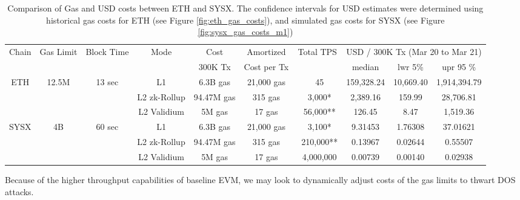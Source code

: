 \documentclass[peerreview]{ieeesyscoin}
\begin{document}
\begin{table}[h!]
\centering
\begin{tabular}{ |c|c|c|c|c|c|c|c|c|c|   } 
\hline
Chain & Gas  Limit & Block Time & Mode & Cost  & Amortized  & Total TPS & \multicolumn{3}{|c|}{USD / 300K Tx (Mar 20 to Mar 21) } \\
 &  &  &  &  300K Tx  & Cost per Tx  &  & median & lwr 5\% &  upr 95 \% \\ 
\hline
\multirow{3}{*}{ETH} & \multirow{3}{*}{12.5M} & \multirow{3}{*}{13 sec} & L1 & 6.3B gas  & 21,000 gas  & ~45 & 159,328.24 & 10,669.40  & 1,914,394.79  \\ 
\multirow{3}{*}{} & \multirow{3}{*}{} & \multirow{3}{*}{} & L2 zk-Rollup & 94.47M gas  & 315 gas & ~3,000* & 2,389.16 & 159.99  & 28,706.81 \\ 
\multirow{3}{*}{} & \multirow{3}{*}{} & \multirow{3}{*}{} & L2 Validium  & 5M gas  & 17 gas & ~56,000** & 126.45 & 8.47  & 1,519.36 \\ 
\hline

\multirow{3}{*}{SYSX} & \multirow{3}{*}{4B} & \multirow{3}{*}{60 sec} & L1 & 6.3B gas  & 21,000 gas  & ~3,100*& 9.31453 & 1.76308 & 37.01621 \\ 
\multirow{3}{*}{} & \multirow{3}{*}{} & \multirow{3}{*}{} & L2 zk-Rollup & 94.47M gas  & 315 gas & ~210,000** & 0.13967 & 0.02644  & 0.55507 \\ 
\multirow{3}{*}{} & \multirow{3}{*}{} & \multirow{3}{*}{} & L2 Validium  & 5M gas  & 17 gas & ~4,000,000 & 0.00739 & 0.00140  & 0.02938 \\ 
\hline

\end{tabular}
\caption{Comparison of Gas and USD costs between ETH and SYSX. The confidence intervals for USD estimates were determined using historical gas costs for ETH (see Figure \ref{fig:eth_gas_costs}), and simulated gas costs for SYSX (see Figure \ref{fig:sysx_gas_costs_m1})}
\label{table:gas_cost_estimates}
\end{table}

Because of the higher throughput capabilities of baseline EVM, we may look to dynamically adjust costs of the gas limits \cite{Che17} to thwart DOS attacks.
\end{document}
